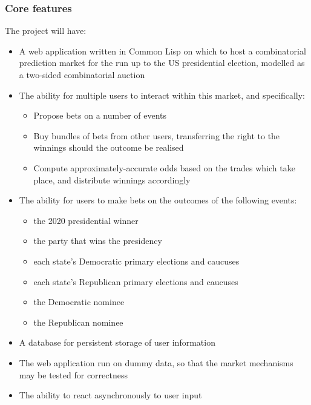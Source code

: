 \documentclass[10pt,a4paper]{article}
\theoremstyle{plain}
\theoremstyle{definition}
\begin{document}
	\subsubsection{Core features}

	The project will have:

	\begin{itemize}
		\itemsep0em
		\item A web application written in Common Lisp on which to host a
			combinatorial prediction market for the run up to the US
			presidential election, modelled as a two-sided combinatorial
			auction

		\item The ability for multiple users to interact within this market,
			and specifically:
			\begin{itemize}
				\itemsep0em
				\item Propose bets on a number of events
				\item Buy bundles of bets from other users, transferring the
					right to the winnings should the outcome be realised
				\item Compute approximately-accurate odds based on the trades
					which take place, and distribute winnings accordingly
			\end{itemize}

		\item The ability for users to make bets on the outcomes of the
			following events:
			\begin{itemize}
				\itemsep0em
				\item the 2020 presidential winner
				\item the party that wins the presidency
				\item each state's Democratic primary elections and caucuses
				\item each state's Republican primary elections and caucuses
				\item the Democratic nominee
				\item the Republican nominee
			\end{itemize}

		\item A database for persistent storage of user information

		\item The web application run on dummy data, so that the market
			mechanisms may be tested for correctness

		\item The ability to react asynchronously to user input
	\end{itemize}
\end{document}
